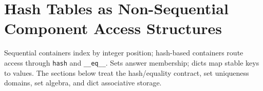 \section{Hash Tables as Non-Sequential Component Access Structures}

Sequential containers index by integer position; hash-based containers route access through \texttt{hash} and \texttt{\_\_eq\_\_}. Sets answer membership; dicts map stable keys to values. The sections below treat the hash/equality contract, set uniqueness domains, set algebra, and dict associative storage.
